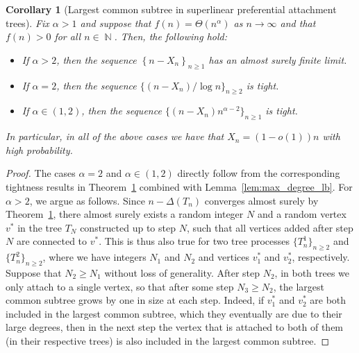\documentclass[11pt]{article}
\numberwithin{equation}{section}
\DeclareMathOperator{\N}{\mathbb{N}} %
\newcommand{\basc}[1]{{\color{red}{ \bf [~Bas:\ }\emph{#1}\textbf{~]}}}
\newtheorem{corollary}[theorem]{Corollary}
\theoremstyle{definition}
\begin{document}
\begin{corollary}[Largest common subtree in superlinear preferential attachment trees]\label{thrm:suplin}
Fix $\alpha > 1$ and suppose that 
$f(n) = \Theta\left( n^{\alpha} \right)$ as $n \to \infty$ 
and that $f(n) > 0$ for all $n\in\N$. Then, the following hold: 
\begin{itemize} 
\item If $\alpha > 2$, then the sequence 
$\left\{ n - X_{n} \right\}_{n \geq 1}$ has an almost surely finite limit.
\item If $\alpha=2$, then the sequence $\{(n-X_n)/\log n\}_{n\geq 2}$ is tight.
\item If $\alpha\in(1,2)$, then the sequence $\{(n-X_n)n^{\alpha-2}\}_{n\geq 1}$ is tight.
\end{itemize}
In particular, in all of the above cases we have that $X_{n} = (1-o(1))n$ with high probability. 
\end{corollary}

\begin{proof}
    The cases $\alpha=2$ and $\alpha\in(1,2)$ directly follow from the corresponding tightness results in Theorem~\ref{thrm:suplin} combined with Lemma~\ref{lem:max_degree_lb}. For $\alpha>2$, we argue as follows. Since $n-\Delta(T_n)$ converges almost surely by Theorem~\ref{thrm:suplin}, there almost surely exists a random integer $N$ and a random vertex $v^*$ in the tree $T_N$ constructed up to step $N$, such that all vertices added after step $N$ are connected to $v^*$. This is thus also true for two tree processes $\{T^1_n\}_{n\geq 2}$ and $\{T^2_n\}_{n\geq 2}$, where we have integers $N_1$ and $N_2$ and vertices $v^*_1$ and $v^*_2$, respectively. Suppose that $N_2\geq N_1$ without loss of generality. After step $N_2$, in both trees we only attach to a single vertex, so that after some step $N_3\geq N_2$, the largest common subtree grows by one in size at each step. Indeed, if $v^*_1$ and $v^*_2$ are both included in the largest common subtree, which they eventually are due to their large degrees, then in the next step the vertex that is attached to both of them (in their respective trees) is also included in the largest common subtree. 
\end{proof}

\end{document}
